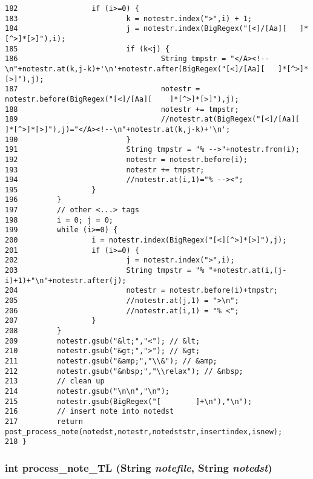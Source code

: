 \begin{verbatim}
182                 if (i>=0) {
183                         k = notestr.index(">",i) + 1;
184                         j = notestr.index(BigRegex("[<]/[Aa][   ]*[^>]*[>]"),i);
185                         if (k<j) {
186                                 String tmpstr = "</A><!--\n"+notestr.at(k,j-k)+'\n'+notestr.after(BigRegex("[<]/[Aa][   ]*[^>]*[>]"),j);
187                                 notestr = notestr.before(BigRegex("[<]/[Aa][    ]*[^>]*[>]"),j);
188                                 notestr += tmpstr;
189                                 //notestr.at(BigRegex("[<]/[Aa][        ]*[^>]*[>]"),j)="</A><!--\n"+notestr.at(k,j-k)+'\n';
190                         }
191                         String tmpstr = "% -->"+notestr.from(i);
192                         notestr = notestr.before(i);
193                         notestr += tmpstr;
194                         //notestr.at(i,1)="% --><";
195                 }
196         }
197         // other <...> tags
198         i = 0; j = 0;
199         while (i>=0) {
200                 i = notestr.index(BigRegex("[<][^>]*[>]"),j);
201                 if (i>=0) {
202                         j = notestr.index(">",i);
203                         String tmpstr = "% "+notestr.at(i,(j-i)+1)+"\n"+notestr.after(j);
204                         notestr = notestr.before(i)+tmpstr;
205                         //notestr.at(j,1) = ">\n";
206                         //notestr.at(i,1) = "% <";
207                 }
208         }
209         notestr.gsub("&lt;","<"); // &lt;
210         notestr.gsub("&gt;",">"); // &gt;
211         notestr.gsub("&amp;","\\&"); // &amp;
212         notestr.gsub("&nbsp;","\\relax"); // &nbsp;
213         // clean up
214         notestr.gsub("\n\n","\n");
215         notestr.gsub(BigRegex("[        ]+\n"),"\n");
216         // insert note into notedst
217         return post_process_note(notedst,notestr,notedststr,insertindex,isnew);
218 }
\end{verbatim}\normalsize 
{}
\subsubsection{\setlength{\rightskip}{0pt plus 5cm}int process\_\-note\_\-TL ({\bf String} {\em notefile}, {\bf String} {\em notedst})}\label{note_8cc_a3}




